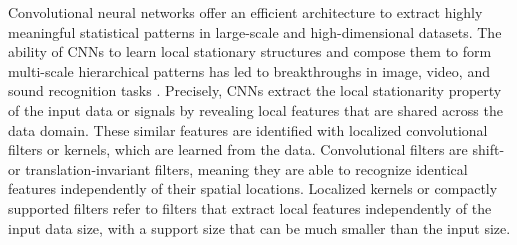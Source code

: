 \documentclass{article}
\begin{document}
Convolutional neural networks \cite{pro:LeCunBottouBengioHaffner98MNIST} offer
an efficient architecture to extract highly meaningful statistical patterns in
large-scale and high-dimensional datasets. The ability of CNNs to learn local
stationary structures and compose them to form multi-scale hierarchical
patterns has led to breakthroughs in image, video, and sound recognition tasks
\cite{art:LeCunBengioHinton15DL}. Precisely, CNNs extract the local
stationarity property of the input data or signals by revealing local features
that are shared across the data domain. These similar features are identified
with localized convolutional filters or kernels, which are learned from the
data. Convolutional filters are shift- or translation-invariant filters,
meaning they are able to recognize identical features independently of their
spatial locations. Localized kernels or compactly supported filters refer to
filters that extract local features independently of the input data size, with
a support size that can be much smaller than the input size.


\end{document}
